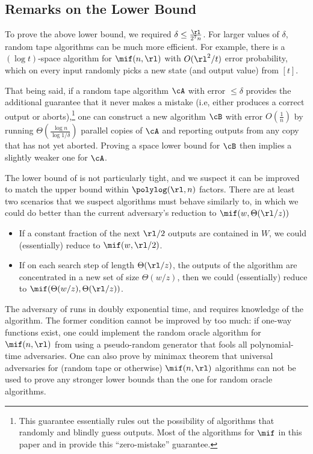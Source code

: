\begin{itemize}
\begin{itemize}
\subsection{Remarks on the Lower Bound}

To prove the above lower bound, we required $\delta \le \frac{\rl}{2^{7} n}$.
For larger values of $\delta$, random tape algorithms can be much more
efficient. For example, there is a $(\log t)$-space algorithm for
$\mif(n,\rl)$ with $O(\rl^2/t)$ error probability, which on every input
randomly picks a new state (and output value) from $[t]$.

That being said, if a random tape algorithm $\cA$ with error $\le \delta$
provides the additional guarantee  that it never makes a mistake (i.e, either
produces a correct output or aborts),\footnote{This guarantee essentially
rules out the possibility of algorithms that randomly and blindly guess
outputs. Most of the algorithms for $\mif$ in this paper and in
\cite{Stoeckl23} provide this ``zero-mistake'' guarantee.} one can construct a
new algorithm $\cB$ with error $O(\frac{1}{n})$ by running $\Theta(\frac{\log
n}{\log 1/\delta})$ parallel copies of $\cA$ and reporting outputs from any
copy that has not yet aborted. Proving a space lower bound for $\cB$ then
implies a slightly weaker one for $\cA$.

The lower bound of  is not particularly tight, and we
suspect it can be improved to match the upper bound within $\polylog(\rl, n)$
factors. There are at least two scenarios that we suspect algorithms must
behave similarly to, in which we could do better than the current adversary's
reduction to $\mif(w, \Theta(\rl/z))$

\begin{itemize}

  \item If a constant fraction of the next $\rl/2$ outputs are contained in
  $W$, we could (essentially) reduce to $\mif(w, \rl/2)$.

  \item If on each search step of length $\Theta(\rl/z)$, the outputs of the
  algorithm are concentrated in a new set of size $\Theta(w/z)$, then we could
  (essentially) reduce to $\mif(\Theta(w/z), \Theta(\rl/z))$.

\end{itemize}

The adversary of  runs in doubly exponential time,
and requires knowledge of the algorithm. The former condition cannot be
improved by too much: if one-way functions exist, one could implement the
random oracle algorithm for $\mif(n,\rl)$ from \cite{Stoeckl23} using a
pseudo-random generator that fools all polynomial-time adversaries.  One can
also prove by minimax theorem that universal adversaries for (random tape or
otherwise) $\mif(n,\rl)$ algorithms can not be used to prove any stronger
lower bounds than the one for random oracle algorithms.


\end{itemize}
\end{itemize}
